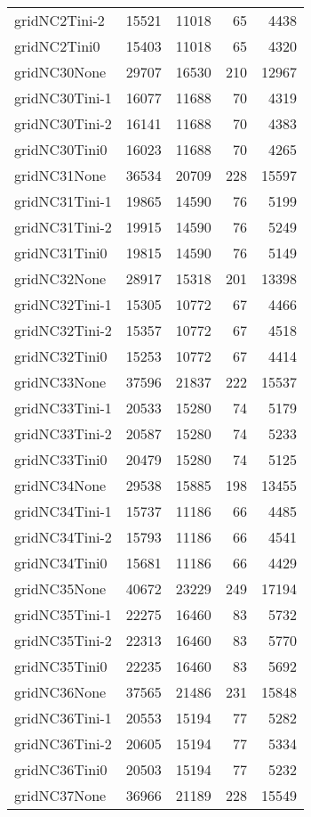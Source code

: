 \begin{longtable}{lrrrr}
gridNC2Tini-2 & 15521 & 11018 & 65 & 4438 \\
gridNC2Tini0 & 15403 & 11018 & 65 & 4320 \\
gridNC30None & 29707 & 16530 & 210 & 12967 \\
gridNC30Tini-1 & 16077 & 11688 & 70 & 4319 \\
gridNC30Tini-2 & 16141 & 11688 & 70 & 4383 \\
gridNC30Tini0 & 16023 & 11688 & 70 & 4265 \\
gridNC31None & 36534 & 20709 & 228 & 15597 \\
gridNC31Tini-1 & 19865 & 14590 & 76 & 5199 \\
gridNC31Tini-2 & 19915 & 14590 & 76 & 5249 \\
gridNC31Tini0 & 19815 & 14590 & 76 & 5149 \\
gridNC32None & 28917 & 15318 & 201 & 13398 \\
gridNC32Tini-1 & 15305 & 10772 & 67 & 4466 \\
gridNC32Tini-2 & 15357 & 10772 & 67 & 4518 \\
gridNC32Tini0 & 15253 & 10772 & 67 & 4414 \\
gridNC33None & 37596 & 21837 & 222 & 15537 \\
gridNC33Tini-1 & 20533 & 15280 & 74 & 5179 \\
gridNC33Tini-2 & 20587 & 15280 & 74 & 5233 \\
gridNC33Tini0 & 20479 & 15280 & 74 & 5125 \\
gridNC34None & 29538 & 15885 & 198 & 13455 \\
gridNC34Tini-1 & 15737 & 11186 & 66 & 4485 \\
gridNC34Tini-2 & 15793 & 11186 & 66 & 4541 \\
gridNC34Tini0 & 15681 & 11186 & 66 & 4429 \\
gridNC35None & 40672 & 23229 & 249 & 17194 \\
gridNC35Tini-1 & 22275 & 16460 & 83 & 5732 \\
gridNC35Tini-2 & 22313 & 16460 & 83 & 5770 \\
gridNC35Tini0 & 22235 & 16460 & 83 & 5692 \\
gridNC36None & 37565 & 21486 & 231 & 15848 \\
gridNC36Tini-1 & 20553 & 15194 & 77 & 5282 \\
gridNC36Tini-2 & 20605 & 15194 & 77 & 5334 \\
gridNC36Tini0 & 20503 & 15194 & 77 & 5232 \\
gridNC37None & 36966 & 21189 & 228 & 15549 \\

\end{longtable}
